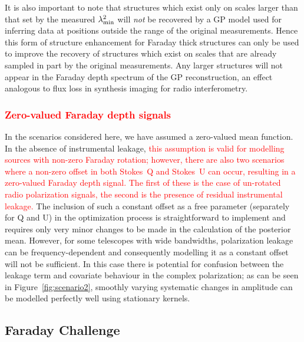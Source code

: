 \documentclass[fleqn,usenatbib]{mnras}
\begin{document}
It is also important to note that structures which exist only on scales larger than that set by the measured $\lambda^2_{\rm min}$ will {\it not} be recovered by a GP model used for inferring data at positions outside the range of the original measurements. Hence this form of structure enhancement for Faraday thick structures can only be used to improve the recovery of structures which exist on scales that are already sampled in part by the original measurements. Any larger structures will not appear in the Faraday depth spectrum of the GP reconstruction, an effect analogous to flux loss in synthesis imaging for radio interferometry.


\subsubsection{\textcolor{red}{Zero-valued Faraday depth signals}}
\label{sec:leakage}

In the scenarios considered here, we have assumed a zero-valued mean function. In the absence of instrumental leakage, \textcolor{red}{this assumption is valid for modelling sources with non-zero Faraday rotation; however, there are also two scenarios where a non-zero offset in both Stokes~Q and Stokes~U can occur, resulting in a zero-valued Faraday depth signal. The first of these is the case of un-rotated radio polarization signals, the second is the presence of residual instrumental leakage.} The inclusion of such a constant offset as a free parameter (separately for Q and U) in the optimization process is straightforward to implement and requires only very minor changes to be made in the calculation of the posterior mean. However, for some telescopes with wide bandwidths, polarization leakage can be frequency-dependent and consequently modelling it as a constant offset will not be sufficient. In this case there is potential for confusion between the leakage term and covariate behaviour in the complex polarization; as can be seen in Figure~\ref{fig:scenario2}, smoothly varying systematic changes in amplitude can be modelled perfectly well using stationary kernels.

\subsection{Faraday Challenge}
\label{sec:challenges}

%
\end{document}
